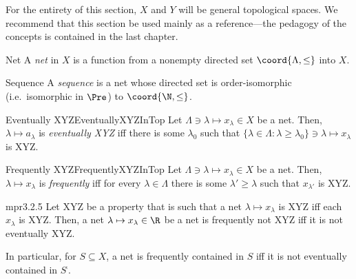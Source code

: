 For the entirety of this section, $X$ and $Y$ will be general topological spaces.  We recommend that this section be used mainly as a reference---the pedagogy of the concepts is contained in the last chapter.
\begin{dfn}{Net}{}
A \emph{net} in $X$ is a function from a nonempty directed set $\coord{\Lambda ,\leq}$ into $X$.
\end{dfn}
\begin{dfn}{Sequence}{}
A \emph{sequence} is a net whose directed set is order-isomorphic (i.e.~isomorphic in $\Pre$) to $\coord{\N ,\leq}$.
\end{dfn}
\begin{mdf}{Eventually XYZ}{EventuallyXYZInTop}
Let $\Lambda \ni \lambda \mapsto x_\lambda \in X$ be a net.  Then, $\lambda \mapsto a_\lambda$ is \emph{eventually XYZ} iff there is some $\lambda _0$ such that $\{ \lambda \in \Lambda :\lambda \geq \lambda _0\} \ni \lambda \mapsto x_\lambda$ is XYZ.
\end{mdf}
\begin{mdf}{Frequently XYZ}{FrequentlyXYZInTop}
Let $\Lambda \ni \lambda \mapsto x_{\lambda}\in X$ be a net.  Then, $\lambda \mapsto x_{\lambda}$ is \emph{frequently} iff for every $\lambda \in \Lambda$ there is some $\lambda '\geq \lambda$ such that $x_{\lambda '}$ is XYZ.
\end{mdf}
\begin{mpr}{}{mpr3.2.5}
Let XYZ be a property that is such that a net $\lambda \mapsto x_{\lambda}$ is XYZ iff each $x_{\lambda}$ is XYZ.  Then, a net $\lambda \mapsto x_{\lambda}\in \R$ be a net is frequently not XYZ iff it is not eventually XYZ.
\begin{rmk}
In particular, for $S\subseteq X$, a net is frequently contained in $S$ iff it is not eventually contained in $S^{\comp}$.
\end{rmk}
\end{mpr}
